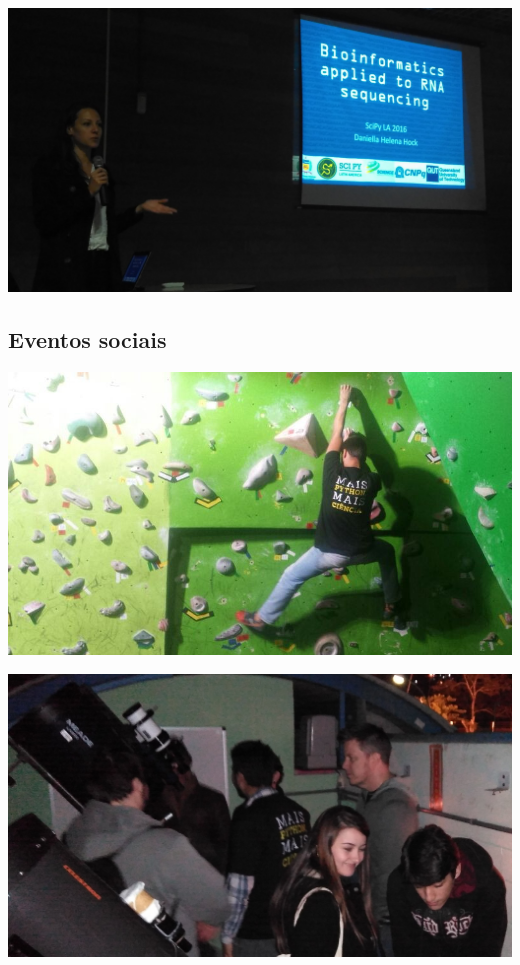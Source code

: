 \documentclass[12pt]{article}
\begin{document}
\noindent  %
\includegraphics[width=\textwidth]{talks-rna.jpg}

\subsection*{Eventos sociais}

\noindent  %
\includegraphics[width=\textwidth]{python-escala.jpg}

\noindent  %
\includegraphics[width=\textwidth]{social-astro.jpg}
\end{document}
